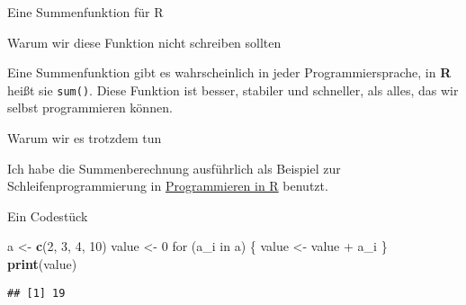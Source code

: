 \documentclass[ignorenonframetext,]{beamer}
\newenvironment{Shaded}{}{}
\newcommand{\KeywordTok}[1]{\textcolor[rgb]{0.00,0.44,0.13}{\textbf{{#1}}}}
\newcommand{\DecValTok}[1]{\textcolor[rgb]{0.25,0.63,0.44}{{#1}}}
\newcommand{\StringTok}[1]{\textcolor[rgb]{0.25,0.44,0.63}{{#1}}}
\newcommand{\NormalTok}[1]{{#1}}
\begin{document}
\begin{frame}[fragile]{Eine Summenfunktion für R}

\begin{block}{Warum wir diese Funktion nicht schreiben sollten}

Eine Summenfunktion gibt es wahrscheinlich in jeder Programmiersprache,
in \textbf{R} heißt sie \texttt{sum()}. Diese Funktion ist besser,
stabiler und schneller, als alles, das wir selbst programmieren können.

\end{block}

\begin{block}{Warum wir es trotzdem tun}

Ich habe die Summenberechnung ausführlich als Beispiel zur
Schleifenprogrammierung in
\href{https://fvafrcu.github.io/programmieren_in_r/\#gute-schleifen}{Programmieren
in R} benutzt.

\end{block}

\end{frame}

\begin{frame}[fragile]{Ein Codestück}

\begin{Shaded}
\begin{Highlighting}[]
\NormalTok{a  <-}\StringTok{ }\KeywordTok{c}\NormalTok{(}\DecValTok{2}\NormalTok{, }\DecValTok{3}\NormalTok{, }\DecValTok{4}\NormalTok{, }\DecValTok{10}\NormalTok{)}
\NormalTok{value <-}\StringTok{ }\DecValTok{0}
\NormalTok{for (a_i in a) \{}
    \NormalTok{value <-}\StringTok{ }\NormalTok{value +}\StringTok{ }\NormalTok{a_i }
\NormalTok{\}}
\KeywordTok{print}\NormalTok{(value)}
\end{Highlighting}
\end{Shaded}

\begin{verbatim}
## [1] 19
\end{verbatim}

\end{frame}
\end{document}
